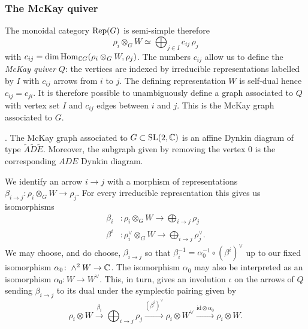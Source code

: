 \documentclass{amsart}
\theoremstyle{definition}
\newcommand\W{W}
\begin{document}
\subsubsection{The McKay quiver}
The monoidal category $\operatorname{Rep}(G)$ is semi-simple therefore $$\rho_i \otimes_G \W \simeq \bigoplus_{j \in I} c_{ij} \, \rho_j$$
with $c_{ij} =\dim \Hom_{\bC G}(\rho_i \otimes_G \W, \rho_j)$.
The numbers $c_{ij}$ allow us to define the {\em McKay quiver} $Q$: the vertices are indexed by irreducible representations labelled by $I$ with $c_{ij}$  arrows from $i$ to $j$.
The defining representation $\W$ is self-dual hence $c_{ij} = c_{ji}$.
It is therefore possible to unambiguously define a graph associated to $Q$ with vertex set $I$ and $c_{ij}$ edges between $i$ and $j$. This is the McKay graph associated to $G$.

\begin{theorem}\cite{MR604577}.
The McKay graph associated to $G \subset \operatorname{SL}(2,\mathbb{C})$ is an affine Dynkin diagram of type $\widetilde{A}\widetilde{D}\widetilde{E}$.
Moreover, the subgraph given by removing the vertex $0$ is the corresponding $ADE$ Dynkin diagram.
\end{theorem}

We identify an arrow $i \rightarrow j$ with a morphism of representations $\beta_{i \rightarrow j} \colon \rho_i \otimes_G \W \rightarrow \rho_j$.
For every irreducible representation this gives us isomorphisms 
\begin{align}
    \beta_i &\colon \rho_i \otimes_G \W \longrightarrow \bigoplus_{i \rightarrow j} \rho_j \\
    \beta^i &\colon \rho_i^\vee \otimes_G \W \longrightarrow \bigoplus_{i \rightarrow j} \rho_j^\vee.
\end{align}
We may choose, and do choose, $\beta_{i \rightarrow j}$ so that $\beta_i^{-1} = \alpha_0^{-1} \circ (\beta^i)^\vee$ up to our fixed isomorphism $\alpha_0 \colon \wedge^2 \W \rightarrow \bC$.
The isomorphism $\alpha_0$ may also be interpreted as an isomorphism $\alpha_0 \colon W \rightarrow W^\vee$.
This, in turn, gives an involution $\iota$ on the arrows of $Q$ sending $\beta_{i \rightarrow j}$ to its dual under the symplectic pairing given by 
$$\rho_i \otimes \W \xrightarrow{\beta_i} \bigoplus_{i \rightarrow j} \rho_j  \xrightarrow {(\beta^i)^\vee} \rho_i \otimes \W^\vee \xrightarrow{\text{id} \otimes \alpha_0} \rho_i \otimes \W.$$
\end{document}
